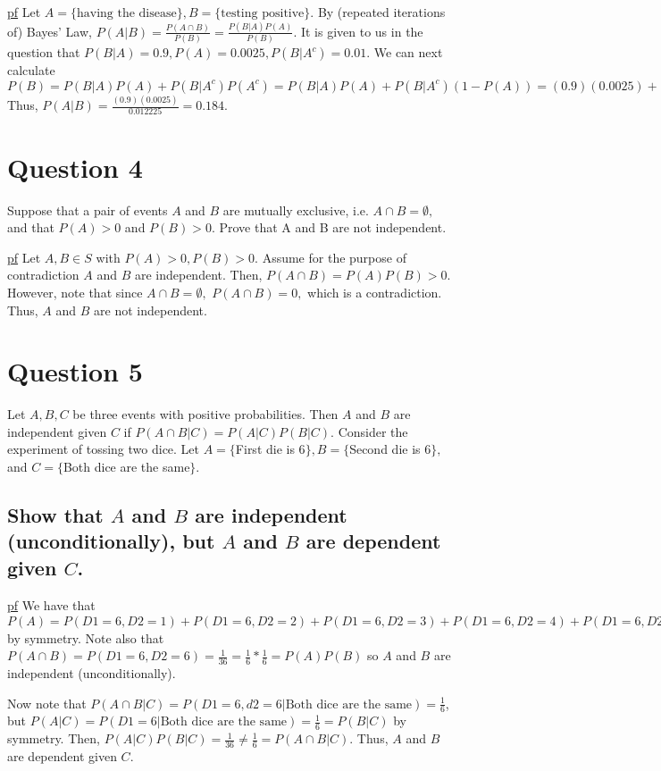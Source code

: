 \documentclass[11pt]{article} %
\begin{document}
\underline{pf} Let $A = \{ \text{having the disease}\}, B = \{ \text{testing positive}\}$. By (repeated iterations of) Bayes' Law, $P(A|B) = \frac{P(A\cap B)}{P(B)} = \frac{P(B|A)P(A)}{P(B)}$. It is given to us in the question that $P(B|A) = 0.9, P(A) = 0.0025, P(B|A^{c}) = 0.01.$ We can next calculate $P(B) = P(B|A)P(A) + P(B|A^{c})P(A^{c}) = P(B|A)P(A) + P(B|A^{c})(1-P(A)) = (0.9)(0.0025) + (0.01)(0.9975) = 0.012225.$ Thus, $P(A|B) = \frac{(0.9)(0.0025)}{0.012225} = 0.184.$

\section{Question 4}
Suppose that a pair of events $A$ and $B$ are mutually exclusive, i.e. $A \cap B = \emptyset,$ and that $P(A)>0$ and $P(B) > 0.$ Prove that A and B are not independent.

\underline{pf} Let $A,B \in S$ with $P(A)>0, P(B)>0.$ Assume for the purpose of contradiction $A$ and $B$ are independent. Then, $P(A \cap B) = P(A)P(B)>0.$ However, note that since $A \cap B = \emptyset,$ $P(A\cap B) = 0,$ which is a contradiction. Thus, $A$ and $B$ are not independent.

\section{Question 5}
Let $A,B,C$ be three events with positive probabilities. Then $A$ and $B$ are independent given $C$ if $P(A \cap B|C) = P(A|C)P(B|C).$ Consider the experiment of tossing two dice. Let $A = \{$First die is 6$\}, B = \{$Second die is 6$\}, $ and $C = \{$Both dice are the same$\}.$

\subsection{Show that $A$ and $B$ are independent (unconditionally), but $A$ and $B$ are dependent given $C$.}
\underline{pf} We have that $P(A) = P(D1 = 6, D2 =1) + P(D1 = 6, D2 =2) + P(D1 = 6, D2 =3) + P(D1 = 6, D2 =4) + P(D1 = 6, D2 =5) + P(D1 = 6, D2 =6) = \frac{1}{6} = P(B)$ by symmetry. Note also that $P(A\cap B) = P(D1 = 6, D2 = 6) = \frac{1}{36} = \frac{1}{6} *\frac{1}{6} = P(A)P(B)$ so $A$ and $B$ are independent (unconditionally).

Now note that $P(A \cap B|C) = P(D1=6, d2=6|\text{Both dice are the same}) = \frac{1}{6}$, but $P(A|C) = P(D1 = 6|\text{Both dice are the same}) = \frac{1}{6} = P(B|C)$ by symmetry. Then, $P(A|C)P(B|C) = \frac{1}{36} \neq \frac{1}{6} = P(A \cap B|C)$. Thus, $A$ and $B$ are dependent given $C$.
\end{document}
